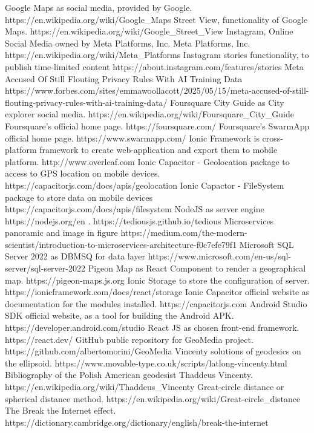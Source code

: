 \documentclass[conference]{IEEEtran}
\begin{document}
\begin{thebibliography}{00}
 Google Maps as social media, provided by Google. https://en.wikipedia.org/wiki/Google\_Maps
 Street View, functionality of Google Maps.
https://en.wikipedia.org/wiki/Google\_Street\_View
 Instagram, Online Social Media owned by Meta Platforms, Inc.
 Meta Platforms, Inc.
https://en.wikipedia.org/wiki/Meta\_Platforms
 Instagram stories functionality, to publish time-limited content
https://about.instagram.com/features/stories
Meta Accused Of Still Flouting Privacy Rules With AI Training Data
https://www.forbes.com/sites/emmawoollacott/2025/05/15/meta-accused-of-still-flouting-privacy-rules-with-ai-training-data/
 Foursquare City Guide as City explorer social media.
https://en.wikipedia.org/wiki/Foursquare\_City\_Guide
 Foursquare's official home page.
https://foursquare.com/
 Foursquare's SwarmApp official home page.
https://www.swarmapp.com/
 Ionic Framework is cross-platform framework to create web-application and export them to mobile platform. http://www.overleaf.com
 Ionic Capacitor - Geolocation package to access to GPS location on mobile devices. https://capacitorjs.com/docs/apis/geolocation
Ionic Capactor - FileSystem package to store data on mobile devices https://capacitorjs.com/docs/apis/filesystem
 NodeJS as server engine https://nodejs.org/en
. https://tediousjs.github.io/tedious
 Microservices panoramic and image in figure https://medium.com/the-modern-scientist/introduction-to-microservices-architecture-f0c7efe79f1
 Microsoft SQL Server 2022 as DBMSQ for data layer https://www.microsoft.com/en-us/sql-server/sql-server-2022
 Pigeon Map as React Component to render a geographical map. https://pigeon-maps.js.org
Ionic Storage to store the configuration of server. https://ionicframework.com/docs/react/storage
Ionic Capacitor official website as documentation for the modules installed. https://capacitorjs.com
Android Studio SDK official website, as a tool for building the Android APK. https://developer.android.com/studio
React JS as chosen front-end framework. https://react.dev/
GitHub public repository for GeoMedia project. https://github.com/albertomorini/GeoMedia
 Vincenty solutions of geodesics on the ellipsoid. 
https://www.movable-type.co.uk/scripts/latlong-vincenty.html
 Bibliography of the Polish American geodesist Thaddeus Vincenty. https://en.wikipedia.org/wiki/Thaddeus\_Vincenty
Great-circle distance or spherical distance method.
https://en.wikipedia.org/wiki/Great-circle\_distance
 The Break the Internet effect. 
https://dictionary.cambridge.org/dictionary/english/break-the-internet

\end{thebibliography}

\vspace{12pt}
\end{document}
